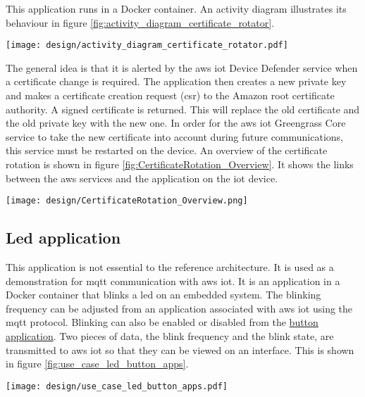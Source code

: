 This application runs in a Docker container. An activity diagram illustrates its behaviour in figure \ref{fig:activity_diagram_certificate_rotator}.
\begin{center}
    \begingroup
    \texttt{[image: design/activity\_diagram\_certificate\_rotator.pdf]}
    \label{fig:activity_diagram_certificate_rotator}
    \endgroup
\end{center}
The general idea is that it is alerted by the \gls{aws} \acrshort{iot} Device Defender service when a certificate change is required. The application then creates a new private key and makes a certificate creation request (\acrfull{csr}) to the Amazon root certificate authority. A signed certificate is returned. This will replace the old certificate and the old private key with the new one. In order for the \gls{aws} \acrshort{iot} Greengrass Core service to take the new certificate into account during future communications, this service must be restarted on the device. An overview of the certificate rotation is shown in figure \ref{fig:CertificateRotation_Overview}. It shows the links between the \gls{aws} services and the application on the \acrshort{iot} device.
\begin{center}
    \begingroup
    \texttt{[image: design/CertificateRotation\_Overview.png]}
    \label{fig:CertificateRotation_Overview}
    \endgroup
\end{center}

\subsection{Led application}
\label{subsec:led_app}
This application is not essential to the reference architecture. It is used as a demonstration for \acrshort{mqtt} communication with \gls{aws} \acrshort{iot}. It is an application in a Docker container that blinks a led on an embedded system. The blinking frequency can be adjusted from an application associated with \gls{aws} \acrshort{iot} using the \acrshort{mqtt} protocol. Blinking can also be enabled or disabled from the \hyperref[subsec:button_app]{button application}. Two pieces of data, the blink frequency and the blink state, are transmitted to \gls{aws} \acrshort{iot} so that they can be viewed on an interface. This is shown in figure \ref{fig:use_case_led_button_apps}.
\begin{center}
    \begingroup
    \texttt{[image: design/use\_case\_led\_button\_apps.pdf]}
    \label{fig:use_case_led_button_apps}
    \endgroup
\end{center}

